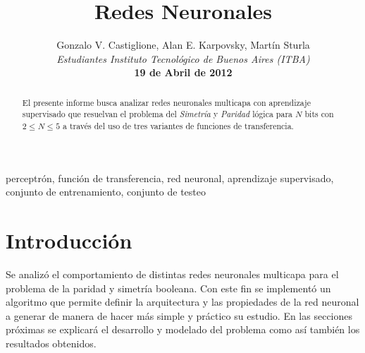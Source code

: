 \documentclass[%
    final,
    reprint,
    notitlepage,
    narroweqnarray,
    inline,
    twoside,
    invited
    ]{ieee}
\begin{document}
\title[Redes Neuronales]{%
       Redes Neuronales}

\author[Castiglione, Karpovsky, Sturla]{Gonzalo V. Castiglione, Alan E. Karpovsky, Martín Sturla\\\textit{Estudiantes 
       Instituto Tecnológico de Buenos Aires (ITBA)}\\
\textbf{19 de Abril de 2012}
}


\lognumber{}
\pubitemident{}


\maketitle               

\begin{abstract} 
El presente informe busca analizar  redes neuronales multicapa
con aprendizaje supervisado que resuelvan el problema del \textit{Simetría} y \textit{Paridad} lógica para $N$ bits 
con $2 \le N \le 5$ a través del uso de tres variantes de funciones de transferencia.

\end{abstract}

\begin{keywords}
perceptrón, función de transferencia, red neuronal, aprendizaje supervisado, conjunto de entrenamiento, conjunto de testeo
\end{keywords}

\section{Introducción}

\par Se analizó el comportamiento de distintas redes neuronales multicapa para el problema de la paridad y simetría booleana. Con este fin se implementó un algoritmo que permite definir la arquitectura y las propiedades de la red neuronal a generar de manera de hacer más simple y práctico su estudio. En las secciones próximas se explicará el desarrollo y modelado del problema como así también los resultados obtenidos.
\end{document}
